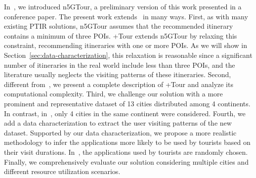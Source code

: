 {In~\cite{fonseca-personlized:19}, we introduced n5GTour, a preliminary version of this work presented in a conference paper. The present work extends~\cite{fonseca-personlized:19} in many ways. First, as with many existing PTIR solutions, n5GTour assumes that the recommended itinerary contains a minimum of three POIs. +Tour extends n5GTour by relaxing this constraint, recommending itineraries with one or more POIs. As we will show in Section~\ref{sec:data-characterization}, this relaxation is reasonable since a significant number of itineraries in the real world include less than three POIs, and the literature usually neglects the visiting patterns of these itineraries. Second, different from~\cite{fonseca-personlized:19}, we present a complete description of +Tour and analyze its computational complexity. Third, we challenge our solution with a more prominent and representative dataset of 13 cities distributed among 4 continents. In contrast, in~\cite{fonseca-personlized:19}, only 4 cities in the same continent were considered. Fourth, we add a data characterization to extract the user visiting patterns of the new dataset. Supported by our data characterization, we propose a more realistic methodology to infer the applications more likely to be used by tourists based on their visit durations. In~\cite{fonseca-personlized:19}, the applications used by tourists are randomly chosen. Finally, we comprehensively evaluate our solution considering multiple cities and different resource utilization scenarios.}















